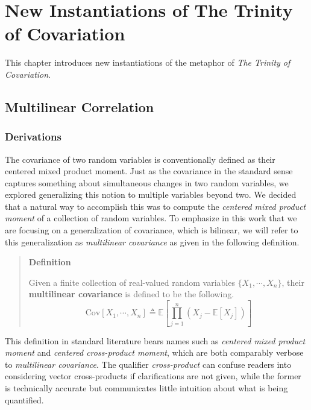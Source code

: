 \documentclass[
  letterpaper,
  DIV=11,
  numbers=noendperiod]{scrreprt}
\begin{document}

\chapter{New Instantiations of The Trinity of
Covariation}\label{new-instantiations-of-the-trinity-of-covariation}

This chapter introduces new instantiations of the metaphor of \emph{The
Trinity of Covariation}.

\section{Multilinear Correlation}\label{multilinear-correlation}

\subsection{Derivations}\label{derivations}

The covariance of two random variables is conventionally defined as
their centered mixed product moment. Just as the covariance in the
standard sense captures something about simultaneous changes in two
random variables, we explored generalizing this notion to multiple
variables beyond two. We decided that a natural way to accomplish this
was to compute the \emph{centered mixed product moment} of a collection
of random variables. To emphasize in this work that we are focusing on a
generalization of covariance, which is bilinear, we will refer to this
generalization as \emph{multilinear covariance} as given in the
following definition.

\begin{quote}
\textbf{Definition}

Given a finite collection of real-valued random variables
\(\{X_1, \cdots, X_n\}\), their \textbf{multilinear covariance} is
defined to be the following.
\[\text{Cov}\left[ X_1, \cdots, X_n \right] \triangleq \mathbb{E}\left[ \prod_{j=1}^{n} \left(X_j - \mathbb{E}[X_j] \right) \right]\]
\end{quote}

This definition in standard literature bears names such as
\emph{centered mixed product moment} and \emph{centered cross-product
moment}, which are both comparably verbose to \emph{multilinear
covariance}. The qualifier \emph{cross-product} can confuse readers into
considering vector cross-products if clarifications are not given, while
the former is technically accurate but communicates little intuition
about what is being quantified.
\end{document}
